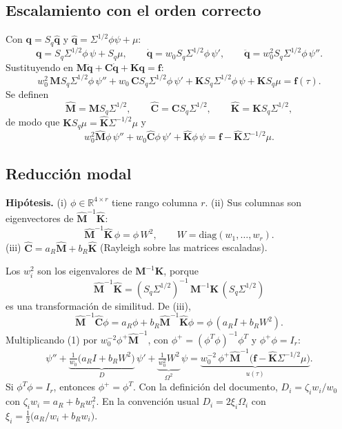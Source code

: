 \subsection{Escalamiento con el orden correcto}

Con $\mathbf q=S_q\hat{\mathbf q}$ y $\hat{\mathbf q}=\Sigma^{1/2}\phi\psi+\mu$:
\[
\mathbf q=S_q\Sigma^{1/2}\phi\,\psi+S_q\mu,\qquad
\dot{\mathbf q}=w_0S_q\Sigma^{1/2}\phi\,\psi',\qquad
\ddot{\mathbf q}=w_0^2S_q\Sigma^{1/2}\phi\,\psi''.
\]
Sustituyendo en $\mathbf M\ddot{\mathbf q}+\mathbf C\dot{\mathbf q}+\mathbf K\mathbf q=\mathbf f$:
\[
w_0^2\,\mathbf MS_q\Sigma^{1/2}\phi\,\psi''+w_0\,\mathbf CS_q\Sigma^{1/2}\phi\,\psi'+\mathbf KS_q\Sigma^{1/2}\phi\,\psi+\mathbf KS_q\mu=\mathbf f(\tau).
\]
Se definen
\[
\hat{\mathbf M}=\mathbf MS_q\Sigma^{1/2},\qquad
\hat{\mathbf C}=\mathbf CS_q\Sigma^{1/2},\qquad
\hat{\mathbf K}=\mathbf KS_q\Sigma^{1/2},
\]
de modo que $\mathbf KS_q\mu=\hat{\mathbf K}\Sigma^{-1/2}\mu$ y
\[
w_0^2\hat{\mathbf M}\phi\,\psi''+w_0\hat{\mathbf C}\phi\,\psi'+\hat{\mathbf K}\phi\,\psi=\mathbf f-\hat{\mathbf K}\Sigma^{-1/2}\mu.
\tag{1}
\]

\subsection{Reducción modal}

\textbf{Hipótesis.} (i) $\phi\in\mathbb R^{4\times r}$ tiene rango columna $r$. (ii) Sus columnas son eigenvectores de $\hat{\mathbf M}^{-1}\hat{\mathbf K}$:
\[
\hat{\mathbf M}^{-1}\hat{\mathbf K}\,\phi=\phi\,W^2,\qquad W=\mathrm{diag}(w_1,\dots,w_r).
\]
(iii) $\hat{\mathbf C}=a_R\hat{\mathbf M}+b_R\hat{\mathbf K}$ (Rayleigh sobre las matrices escaladas).

Los $w_i^2$ son los eigenvalores de $\mathbf M^{-1}\mathbf K$, porque
\[
\hat{\mathbf M}^{-1}\hat{\mathbf K}=(S_q\Sigma^{1/2})^{-1}\,\mathbf M^{-1}\mathbf K\,(S_q\Sigma^{1/2})
\]
es una transformación de similitud. De (iii),
\[
\hat{\mathbf M}^{-1}\hat{\mathbf C}\phi=a_R\phi+b_R\hat{\mathbf M}^{-1}\hat{\mathbf K}\phi=\phi\,(a_RI+b_RW^2).
\]
Multiplicando (1) por $w_0^{-2}\phi^{+}\hat{\mathbf M}^{-1}$, con $\phi^{+}=(\phi^T\phi)^{-1}\phi^T$ y $\phi^{+}\phi=I_r$:
\[
\psi''+\underbrace{\tfrac{1}{w_0}\big(a_RI+b_RW^2\big)}_{D}\,\psi'+\underbrace{\tfrac{1}{w_0^2}W^2}_{\Omega^2}\,\psi
=\underbrace{w_0^{-2}\,\phi^{+}\hat{\mathbf M}^{-1}\big(\mathbf f-\hat{\mathbf K}\Sigma^{-1/2}\mu\big)}_{u(\tau)}.
\tag{2}
\]
Si $\phi^T\phi=I_r$, entonces $\phi^{+}=\phi^T$. Con la definición del documento, $D_i=\zeta_iw_i/w_0$ con $\zeta_iw_i=a_R+b_Rw_i^2$. En la convención usual $D_i=2\xi_i\Omega_i$ con $\xi_i=\tfrac12\big(a_R/w_i+b_Rw_i\big)$.

